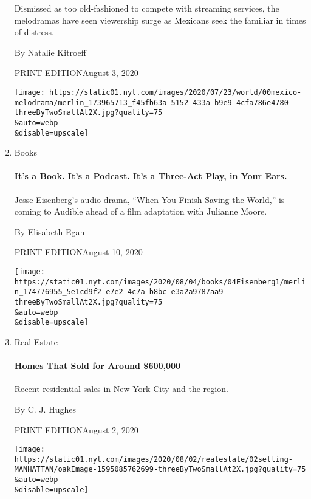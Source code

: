 \begin{enumerate}
  Dismissed as too old-fashioned to compete with streaming services, the
  melodramas have seen viewership surge as Mexicans seek the familiar in
  times of distress.

  By Natalie Kitroeff

  PRINT EDITIONAugust 3, 2020

  \texttt{[image: https://static01.nyt.com/images/2020/07/23/world/00mexico-melodrama/merlin\_173965713\_f45fb63a-5152-433a-b9e9-4cfa786e4780-threeByTwoSmallAt2X.jpg?quality=75\\\&auto=webp\\\&disable=upscale]}
\item
  Books

  \href{/2020/08/02/books/jesse-eisenberg-when-you-finish-saving-the-world-audio.html?searchResultPosition=9}{}

  \hypertarget{its-a-book-its-a-podcast-its-a-three-act-play-in-your-ears}{%
  \paragraph{It's a Book. It's a Podcast. It's a Three-Act Play, in Your
  Ears.}\label{its-a-book-its-a-podcast-its-a-three-act-play-in-your-ears}}

  Jesse Eisenberg's audio drama, ``When You Finish Saving the World,''
  is coming to Audible ahead of a film adaptation with Julianne Moore.

  By Elisabeth Egan

  PRINT EDITIONAugust 10, 2020

  \texttt{[image: https://static01.nyt.com/images/2020/08/04/books/04Eisenberg1/merlin\_174776955\_5e1cd9f2-e7e2-4c7a-b8bc-e3a2a9787aa9-threeByTwoSmallAt2X.jpg?quality=75\\\&auto=webp\\\&disable=upscale]}
\item
  Real Estate

  \href{/2020/08/02/realestate/homes-that-sold-for-around-600000.html?searchResultPosition=10}{}

  \hypertarget{homes-that-sold-for-around-600000}{%
  \paragraph{Homes That Sold for Around
  \$600,000}\label{homes-that-sold-for-around-600000}}

  Recent residential sales in New York City and the region.

  By C. J. Hughes

  PRINT EDITIONAugust 2, 2020

  \texttt{[image: https://static01.nyt.com/images/2020/08/02/realestate/02selling-MANHATTAN/oakImage-1595085762699-threeByTwoSmallAt2X.jpg?quality=75\\\&auto=webp\\\&disable=upscale]}
\end{enumerate}

